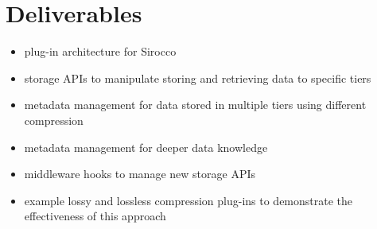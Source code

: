 \section{Deliverables}

\begin{itemize}
\item plug-in architecture for Sirocco
\item storage APIs to manipulate storing and retrieving data to specific tiers
\item metadata management for data stored in multiple tiers using different compression
\item metadata management for deeper data knowledge
\item middleware hooks to manage new storage APIs
\item example lossy and lossless compression plug-ins to demonstrate the effectiveness of this approach
\end{itemize}
